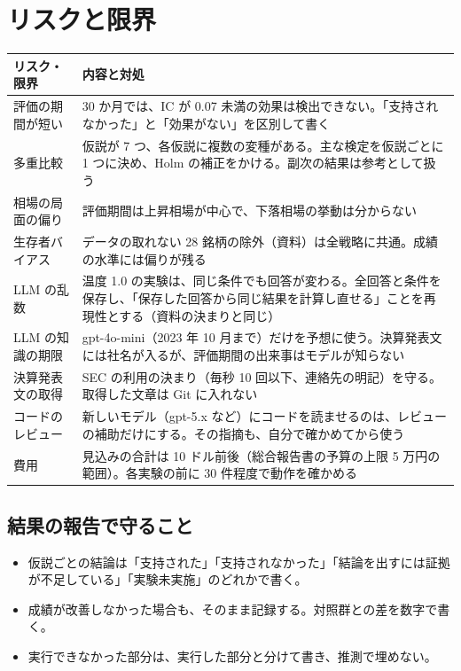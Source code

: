 \documentclass[xelatex,ja=standard,jafont=haranoaji,a4paper,10pt,openany]{bxjsreport}
\begin{document}
\chapter{リスクと限界}\label{ch:risk}

\begin{longtable}{p{4.0cm}p{10.9cm}}
\toprule
\textbf{リスク・限界} & \textbf{内容と対処} \\
\midrule
\endfirsthead
\bottomrule
\endfoot
評価の期間が短い & 30 か月では、IC が 0.07 未満の効果は検出できない。「支持されなかった」と「効果がない」を区別して書く \\
多重比較 & 仮説が 7 つ、各仮説に複数の変種がある。主な検定を仮説ごとに 1 つに決め、Holm の補正をかける。副次の結果は参考として扱う \\
相場の局面の偏り & 評価期間は上昇相場が中心で、下落相場の挙動は分からない \\
生存者バイアス & データの取れない 28 銘柄の除外（資料）は全戦略に共通。成績の水準には偏りが残る \\
LLM の乱数 & 温度 1.0 の実験は、同じ条件でも回答が変わる。全回答と条件を保存し、「保存した回答から同じ結果を計算し直せる」ことを再現性とする（資料の決まりと同じ） \\
LLM の知識の期限 & gpt-4o-mini（2023 年 10 月まで）だけを予想に使う。決算発表文には社名が入るが、評価期間の出来事はモデルが知らない \\
決算発表文の取得 & SEC の利用の決まり（毎秒 10 回以下、連絡先の明記）を守る。取得した文章は Git に入れない \\
コードのレビュー & 新しいモデル（gpt-5.x など）にコードを読ませるのは、レビューの補助だけにする。その指摘も、自分で確かめてから使う \\
費用 & 見込みの合計は 10 ドル前後（総合報告書の予算の上限 5 万円の範囲）。各実験の前に 30 件程度で動作を確かめる \\
\end{longtable}

\section*{結果の報告で守ること}

\begin{itemize}
\item 仮説ごとの結論は「支持された」「支持されなかった」「結論を出すには証拠が不足している」「実験未実施」のどれかで書く。
\item 成績が改善しなかった場合も、そのまま記録する。対照群との差を数字で書く。
\item 実行できなかった部分は、実行した部分と分けて書き、推測で埋めない。
\end{itemize}
\end{document}
